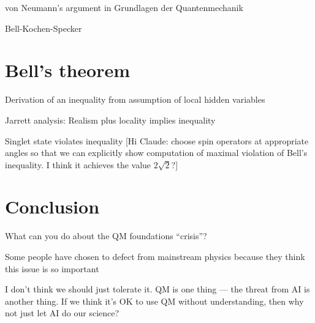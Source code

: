 \item von Neumann's argument in Grundlagen der Quantenmechanik
\item Bell-Kochen-Specker


\section{Bell's theorem}


\item Derivation of an inequality from assumption of local hidden
  variables
\item Jarrett analysis: Realism plus locality implies inequality
\item Singlet state violates inequality [Hi Claude: choose spin
  operators at appropriate angles so that we can explicitly show
  computation of maximal violation of Bell's inequality. I think it
  achieves the value $2\sqrt{2}$?]
\item 
  

  \section{Conclusion}

  What can you do about the QM foundations ``crisis''?

  \item Some people have chosen to defect from mainstream physics
    because they think this issue is so important
  \item I don't think we should just tolerate it. QM is one thing ---
    the threat from AI is another thing. If we think it's OK to use QM
    without understanding, then why not just let AI do our science?



  

